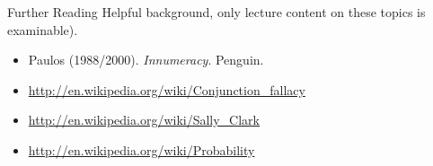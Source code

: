 \documentclass{beamer}
\begin{document}
\begin{frame}{Further Reading}
Helpful background, only lecture content on these topics is examinable).
\begin{itemize}
\item Paulos (1988/2000). \emph{Innumeracy}. Penguin.
\item  \url{http://en.wikipedia.org/wiki/Conjunction_fallacy}
\item  \url{http://en.wikipedia.org/wiki/Sally_Clark}
\item  \url{http://en.wikipedia.org/wiki/Probability}
\end{itemize}
\end{frame}
\end{document}
